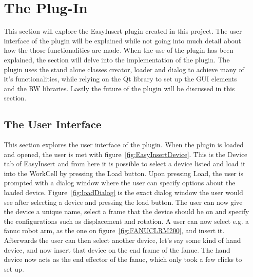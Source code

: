 \clearpage

\section{The Plug-In}

This section will explore the EasyInsert plugin created in this project. The user interface of the plugin will be explained while not going into much detail about how the those functionalities are made. When the use of the plugin has been explained, the section will delve into the implementation of the plugin. The plugin uses the stand alone classes creator, loader and dialog to achieve many of it's functionalities, while relying on the Qt library to set up the GUI elements and the RW libraries. Lastly the future of the plugin will be discussed in this section.
	
\subsection{The User Interface}
\label{sec:UserInterface}
This section explores the user interface of the plugin. When the plugin is loaded and opened, the user is met with figure~\ref{fig:EasyInsertDevice}. This is the Device tab of EasyInsert and from here it is possible to select a device listed and load it into the WorkCell by pressing the Load button. Upon pressing Load, the user is prompted with a dialog window where the user can specify options about the loaded device. Figure~\ref{fig:loadDialog} is the exact dialog window the user would see after selecting a device and pressing the load button. The user can now give the device a unique name, select a frame that the device should be on and specify the configurations such as displacement and rotation. A user can now select e.g. a fanuc robot arm, as the one on figure~\ref{fig:FANUCLRM200}, and insert it. Afterwards the user can then select another device, let's say some kind of hand device, and now insert that device on the end frame of the fanuc. The hand device now acts as the end effector of the fanuc, which only took a few clicks to set up. 

